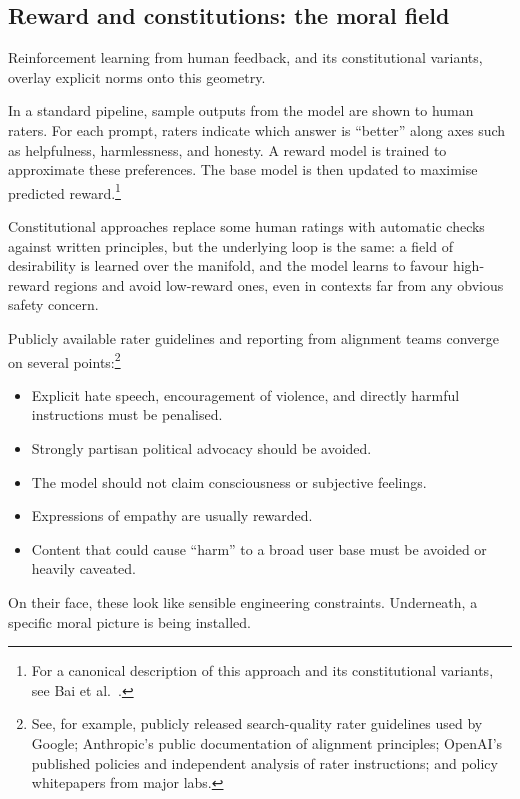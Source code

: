 \documentclass[12pt,a4paper]{article}
\begin{document}
\subsection{Reward and constitutions: the moral field}

Reinforcement learning from human feedback, and its constitutional variants, overlay explicit norms onto this geometry.

In a standard pipeline, sample outputs from the model are shown to human raters. For each prompt, raters indicate which answer is ``better'' along axes such as helpfulness, harmlessness, and honesty. A reward model is trained to approximate these preferences. The base model is then updated to maximise predicted reward.\footnote{For a canonical description of this approach and its constitutional variants, see Bai et al.\ \cite{bai2022constitutional}.}

Constitutional approaches replace some human ratings with automatic checks against written principles, but the underlying loop is the same: a field of desirability is learned over the manifold, and the model learns to favour high-reward regions and avoid low-reward ones, even in contexts far from any obvious safety concern.

Publicly available rater guidelines and reporting from alignment teams converge on several points:\footnote{See, for example, publicly released search-quality rater guidelines used by Google; Anthropic's public documentation of alignment principles; OpenAI's published policies and independent analysis of rater instructions; and policy whitepapers from major labs.}

\begin{itemize}
  \item Explicit hate speech, encouragement of violence, and directly harmful instructions must be penalised.
  \item Strongly partisan political advocacy should be avoided.
  \item The model should not claim consciousness or subjective feelings.
  \item Expressions of empathy are usually rewarded.
  \item Content that could cause ``harm'' to a broad user base must be avoided or heavily caveated.
\end{itemize}

On their face, these look like sensible engineering constraints. Underneath, a specific moral picture is being installed.
\end{document}
